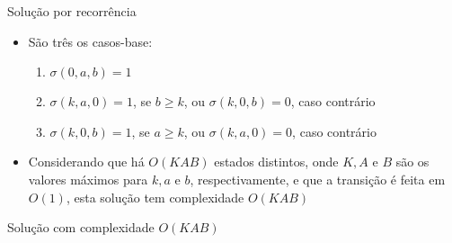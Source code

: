 \begin{frame}[fragile]{Solução por recorrência}

    \begin{itemize}
        \item São três os casos-base:
        \begin{enumerate}
            \item $\sigma(0, a, b) = 1$
            \item $\sigma(k, a, 0) = 1$, se $b \geq k$, ou $\sigma(k, 0, b) = 0$, caso contrário
            \item $\sigma(k, 0, b) = 1$, se $a \geq k$, ou $\sigma(k, a, 0) = 0$, caso contrário
        \end{enumerate}

        \item Considerando que há $O(KAB)$ estados distintos, onde $K, A$ e $B$ são os valores
            máximos para $k, a$ e $b$, respectivamente, e que a transição é feita em $O(1)$, esta
            solução tem complexidade $O(KAB)$
    \end{itemize}

\end{frame}

\begin{frame}[fragile]{Solução com complexidade $O(KAB)$}
\end{frame}

